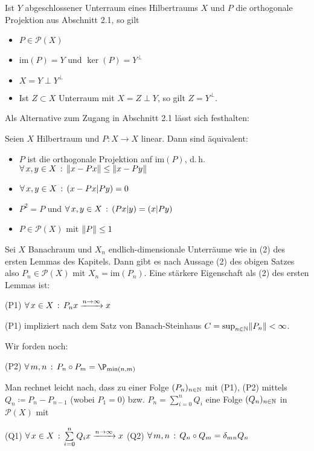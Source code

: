 \documentclass{cheat-sheet}
\begin{document}
\begin{lem}
  Ist $Y$ abgeschlossener Unterraum eines Hilbertraums $X$ und $P$ die orthogonale Projektion aus Abschnitt 2.1, so gilt
  \begin{itemize}
    \item $P \in \mathcal{P}(X)$
    \item $\mathrm{im}(P) = Y$ und $\ker (P) = Y^\perp$
    \item $X = Y \perp Y^\perp$
    \item Ist $Z \subset X$ Unterraum mit $X = Z \perp Y$, so gilt $Z = Y^\perp$.
  \end{itemize}
\end{lem}

Als Alternative zum Zugang in Abschnitt 2.1 lässt sich festhalten:

\begin{lem}
  Seien $X$ Hilbertraum und $P : X \to X$ linear. Dann sind äquivalent:
  \begin{itemize}
    \item $P$ ist die orthogonale Projektion auf $\mathrm{im}(P)$, d.\,h. $\forall \, {x,y \in X} \,:\, \lVert x-Px\rVert \leq \lVert x - Py\rVert$
    \item $\forall \, {x,y \in X} \,:\, (x-Px | Py) = 0$
    \item $P^2 = P$ und $\forall \, {x,y \in X} \,:\, (Px | y) = (x | Py)$
    \item $P \in \mathcal{P}(X)$ mit $\lVert P\rVert \leq 1$
  \end{itemize}
\end{lem}

Sei $X$ Banachraum und $X_n$ endlich-dimensionale Unterräume wie in (2) des ersten Lemmas des Kapitels. Dann gibt es nach Aussage (2) des obigen Satzes also $P_n \in \mathcal{P}(X)$ mit $X_n = \mathrm{im}(P_n)$. Eine stärkere Eigenschaft als (2) des ersten Lemmas ist:

(P1) $\forall \, {x \in X} \,:\, P_n x \xrightarrow{n \to \infty} x$

(P1) impliziert nach dem Satz von Banach-Steinhaus $C = \sup_{n \in \mathbb{N}} \lVert P_n\rVert < \infty$.

Wir forden noch:

(P2) $\fa{m, n} P_n \circ P_m = \P_{\min(n, m)}$

Man rechnet leicht nach, dass zu einer Folge $(P_n)_{n \in \mathbb{N}}$ mit (P1), (P2) mittels $Q_n \coloneqq P_n - P_{n-1}$ (wobei $P_1 = 0$) bzw. $P_n = \sum_{i=0}^n Q_i$ eine Folge $(Q_n)_{n \in \mathbb{N}}$ in $\mathcal{P}(X)$ mit

(Q1) $\fa{x \in X} \sum_{i=0}^n Q_i x \xrightarrow{n \to \infty} x$
(Q2) $\forall \, {m,n} \,:\, Q_n \circ Q_m = \delta_{mn} Q_n$
\end{document}
